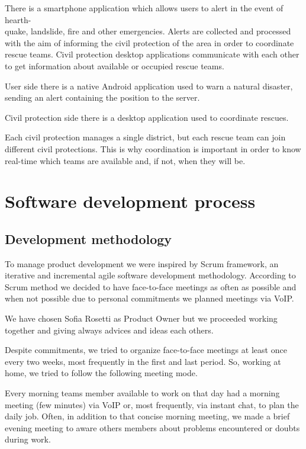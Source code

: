 \documentclass[a4paper,12pt]{report}
\begin{document}
There is a smartphone application which allows users to alert in the event of hearth-\\quake, landslide, fire and other emergencies.
Alerts are collected and processed with the aim of informing the civil protection of the area in order to coordinate rescue teams.
Civil protection desktop applications communicate with each other to get information about available or occupied rescue teams.

User side there is a native Android application used to warn a natural disaster, sending an alert containing the position to the server.

Civil protection side there is a desktop application used to coordinate rescues.

Each civil protection manages a single district, but each rescue team can join different civil protections. This is why coordination is important in order to know real-time which teams are available and, if not, when they will be.


\chapter{Software development process}

\section{Development methodology}

To manage product development we were inspired by Scrum framework, an iterative and incremental agile software development methodology.
According to Scrum method we decided to have face-to-face meetings as often as possible and when not possible due to personal commitments we planned meetings via VoIP.

We have chosen Sofia Rosetti as Product Owner but we proceeded working together and giving always advices and ideas each others.

Despite commitments, we tried to organize face-to-face meetings at least once every two weeks, most frequently in the first and last period. So, working at home, we tried to follow the following meeting mode.

Every morning teams member available to work on that day had a morning meeting (few minutes) via VoIP or, most frequently, via instant chat, to plan the daily job.
Often, in addition to that concise morning meeting, we made a brief evening meeting to aware others members about problems encountered or doubts during work.
\end{document}
